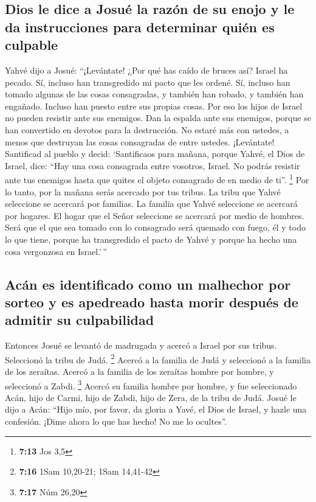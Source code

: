 \begin{paracol}{2}
\hypertarget{dios-le-dice-a-josuuxe9-la-razuxf3n-de-su-enojo-y-le-da-instrucciones-para-determinar-quiuxe9n-es-culpable}{%
\subsection{Dios le dice a Josué la razón de su enojo y le da
instrucciones para determinar quién es
culpable}\label{dios-le-dice-a-josuuxe9-la-razuxf3n-de-su-enojo-y-le-da-instrucciones-para-determinar-quiuxe9n-es-culpable}}

 Yahvé dijo a Josué: ``¡Levántate! ¿Por qué has caído de
bruces así?  Israel ha pecado. Sí, incluso han
transgredido mi pacto que les ordené. Sí, incluso han tomado algunas de
las cosas consagradas, y también han robado, y también han engañado.
Incluso han puesto entre sus propias cosas.  Por eso los
hijos de Israel no pueden resistir ante sus enemigos. Dan la espalda
ante sus enemigos, porque se han convertido en devotos para la
destrucción. No estaré más con ustedes, a menos que destruyan las cosas
consagradas de entre ustedes.  ¡Levántate! Santificad al
pueblo y decid: `Santificaos para mañana, porque Yahvé, el Dios de
Israel, dice: ``Hay una cosa consagrada entre vosotros, Israel. No
podrás resistir ante tus enemigos hasta que quites el objeto consagrado
de en medio de ti''. \footnote{\textbf{7:13} Jos 3,5} 
Por lo tanto, por la mañana serás acercado por tus tribus. La tribu que
Yahvé seleccione se acercará por familias. La familia que Yahvé
seleccione se acercará por hogares. El hogar que el Señor seleccione se
acercará por medio de hombres.  Será que el que sea
tomado con lo consagrado será quemado con fuego, él y todo lo que tiene,
porque ha transgredido el pacto de Yahvé y porque ha hecho una cosa
vergonzosa en Israel.'\,''

\hypertarget{acuxe1n-es-identificado-como-un-malhechor-por-sorteo-y-es-apedreado-hasta-morir-despuuxe9s-de-admitir-su-culpabilidad}{%
\subsection{Acán es identificado como un malhechor por sorteo y es
apedreado hasta morir después de admitir su
culpabilidad}\label{acuxe1n-es-identificado-como-un-malhechor-por-sorteo-y-es-apedreado-hasta-morir-despuuxe9s-de-admitir-su-culpabilidad}}

 Entonces Josué se levantó de madrugada y acercó a Israel
por sus tribus. Seleccionó la tribu de Judá. \footnote{\textbf{7:16}
  1Sam 10,20-21; 1Sam 14,41-42}  Acercó a la familia de
Judá y seleccionó a la familia de los zeraítas. Acercó a la familia de
los zeraítas hombre por hombre, y seleccionó a Zabdi. \footnote{\textbf{7:17}
  Núm 26,20}  Acercó su familia hombre por hombre, y fue
seleccionado Acán, hijo de Carmi, hijo de Zabdi, hijo de Zera, de la
tribu de Judá.  Josué le dijo a Acán: ``Hijo mío, por
favor, da gloria a Yavé, el Dios de Israel, y hazle una confesión. ¡Dime
ahora lo que has hecho! No me lo ocultes''.


\end{paracol}
